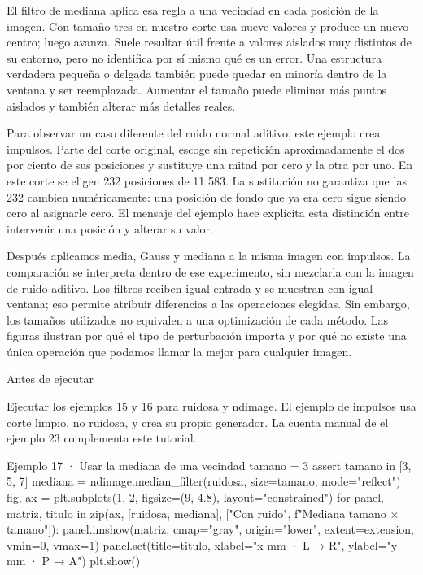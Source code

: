 El filtro de mediana aplica esa regla a una vecindad en cada posición de la imagen. Con tamaño tres en nuestro corte usa nueve valores y produce un nuevo centro; luego avanza. Suele resultar útil frente a valores aislados muy distintos de su entorno, pero no identifica por sí mismo qué es un error. Una estructura verdadera pequeña o delgada también puede quedar en minoría dentro de la ventana y ser reemplazada. Aumentar el tamaño puede eliminar más puntos aislados y también alterar más detalles reales.


Para observar un caso diferente del ruido normal aditivo, este ejemplo crea impulsos. Parte del corte original, escoge sin repetición aproximadamente el dos por ciento de sus posiciones y sustituye una mitad por cero y la otra por uno. En este corte se eligen 232 posiciones de 11 583. La sustitución no garantiza que las 232 cambien numéricamente: una posición de fondo que ya era cero sigue siendo cero al asignarle cero. El mensaje del ejemplo hace explícita esta distinción entre intervenir una posición y alterar su valor.


Después aplicamos media, Gauss y mediana a la misma imagen con impulsos. La comparación se interpreta dentro de ese experimento, sin mezclarla con la imagen de ruido aditivo. Los filtros reciben igual entrada y se muestran con igual ventana; eso permite atribuir diferencias a las operaciones elegidas. Sin embargo, los tamaños utilizados no equivalen a una optimización de cada método. Las figuras ilustran por qué el tipo de perturbación importa y por qué no existe una única operación que podamos llamar la mejor para cualquier imagen.



\begin{Idea}{Antes de ejecutar}

Ejecutar los ejemplos 15 y 16 para ruidosa y ndimage. El ejemplo de impulsos usa corte limpio, no ruidosa, y crea su propio generador. La cuenta manual de el ejemplo 23 complementa este tutorial.


\end{Idea}

\begin{Codigo}{Ejemplo 17 · Usar la mediana de una vecindad}
tamano = 3
assert tamano in [3, 5, 7]
mediana = ndimage.median_filter(ruidosa, size=tamano, mode="reflect")
fig, ax = plt.subplots(1, 2, figsize=(9, 4.8), layout="constrained")
for panel, matriz, titulo in zip(ax, [ruidosa, mediana], ["Con ruido", f"Mediana {tamano} × {tamano}"]):
    panel.imshow(matriz, cmap="gray", origin="lower", extent=extension, vmin=0, vmax=1)
    panel.set(title=titulo, xlabel="x mm · L → R", ylabel="y mm · P → A")
plt.show()
\end{Codigo}


